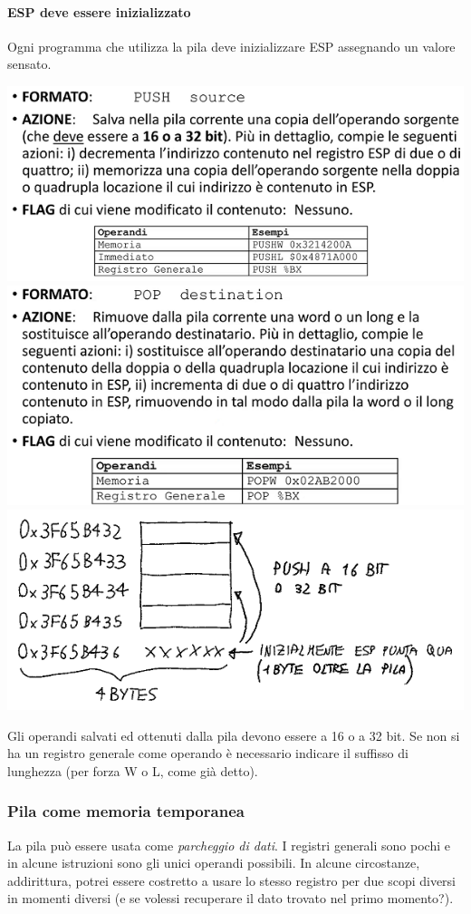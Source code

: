 \documentclass[11pt]{report}
\begin{document}
\paragraph{ESP deve essere inizializzato} Ogni programma che utilizza la pila deve inizializzare ESP assegnando un valore sensato.
\begin{center}
\includegraphics{img/14.PNG}
\includegraphics{img/15.PNG}
\includegraphics{img/212.PNG}
\end{center}
Gli operandi salvati ed ottenuti dalla pila devono essere a 16 o a 32 bit. Se non si ha un registro generale come operando è necessario indicare il suffisso di lunghezza (per forza W o L, come già detto).

\subsubsection{Pila come memoria temporanea}
La pila può essere usata come \emph{parcheggio di dati}. I registri generali sono pochi e in alcune istruzioni sono gli unici operandi possibili. In alcune circostanze, addirittura, potrei essere costretto a usare lo stesso registro per due scopi diversi in momenti diversi (e se volessi recuperare il dato trovato nel primo momento?). 
\end{document}

